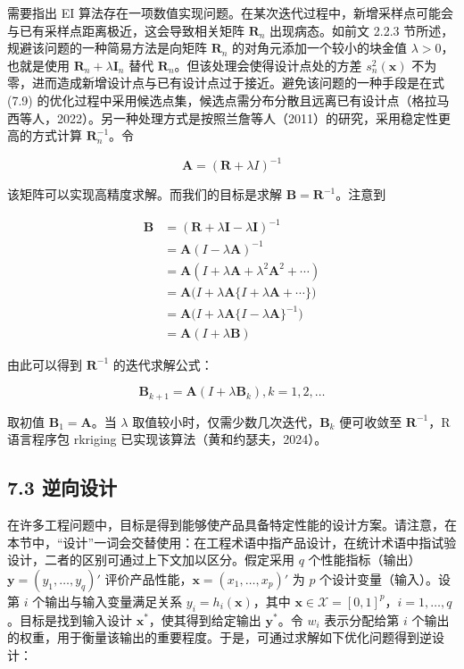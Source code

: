 \documentclass{ctexart}
\begin{document}
需要指出 EI 算法存在一项数值实现问题。在某次迭代过程中，新增采样点可能会与已有采样点距离极近，这会导致相关矩阵 $\boldsymbol{R}_n$ 出现病态。如前文 2.2.3 节所述，规避该问题的一种简易方法是向矩阵 $\boldsymbol{R}_n$ 的对角元添加一个较小的块金值 $\lambda>0$，也就是使用 $\boldsymbol{R}_n+\lambda\boldsymbol{I}_n$ 替代 $\boldsymbol{R}_n$。但该处理会使得设计点处的方差 $s_n^2(\boldsymbol{x})$ 不为零，进而造成新增设计点与已有设计点过于接近。避免该问题的一种手段是在式 (7.9) 的优化过程中采用候选点集，候选点需分布分散且远离已有设计点（格拉马西等人，2022）。另一种处理方式是按照兰詹等人（2011）的研究，采用稳定性更高的方式计算 $\boldsymbol{R}_n^{-1}$。令

\begin{equation*}
\boldsymbol{A}=(\boldsymbol{R}+\lambda I)^{-1}
\end{equation*}

该矩阵可以实现高精度求解。而我们的目标是求解 $\boldsymbol{B}=\boldsymbol{R}^{-1}$。注意到

\begin{align*}
\boldsymbol{B}&=(\boldsymbol{R}+\lambda\boldsymbol{I}-\lambda\boldsymbol{I})^{-1}\\
&=\boldsymbol{A}(I-\lambda\boldsymbol{A})^{-1}\\
&=\boldsymbol{A}(I+\lambda\boldsymbol{A}+\lambda^2\boldsymbol{A}^2+\cdots)\\
&=\boldsymbol{A}\bigl(I+\lambda\boldsymbol{A}\{I+\lambda\boldsymbol{A}+\cdots\}\bigr)\\
&=\boldsymbol{A}\bigl(I+\lambda\boldsymbol{A}\{I-\lambda\boldsymbol{A}\}^{-1}\bigr)\\
&=\boldsymbol{A}(I+\lambda\boldsymbol{B})
\end{align*}

由此可以得到 $\boldsymbol{R}^{-1}$ 的迭代求解公式：

\begin{equation*}
\boldsymbol{B}_{k+1}=\boldsymbol{A}(I+\lambda\boldsymbol{B}_k),k=1,2,\dots
\end{equation*}

取初值 $\boldsymbol{B}_1=\boldsymbol{A}$。当 $\lambda$ 取值较小时，仅需少数几次迭代，$\boldsymbol{B}_k$ 便可收敛至 $\boldsymbol{R}^{-1}$，R 语言程序包 rkriging 已实现该算法（黄和约瑟夫，2024）。

\subsection*{7.3 逆向设计}

在许多工程问题中，目标是得到能够使产品具备特定性能的设计方案。请注意，在本节中，“设计”一词会交替使用：在工程术语中指产品设计，在统计术语中指试验设计，二者的区别可通过上下文加以区分。假定采用 $q$ 个性能指标（输出）$\boldsymbol y=(y_1,\dots,y_q)'$ 评价产品性能，$\boldsymbol x=(x_1,\dots,x_p)'$ 为 $p$ 个设计变量（输入）。设第 $i$ 个输出与输入变量满足关系 $y_i=h_i(\boldsymbol x)$，其中 $\boldsymbol x\in \mathcal X=[0,1]^p$，$i=1,\dots,q$。目标是找到输入设计 $\boldsymbol x^*$，使其得到给定输出 $\boldsymbol y^*$。令 $w_i$ 表示分配给第 $i$ 个输出的权重，用于衡量该输出的重要程度。于是，可通过求解如下优化问题得到逆设计：
\end{document}
